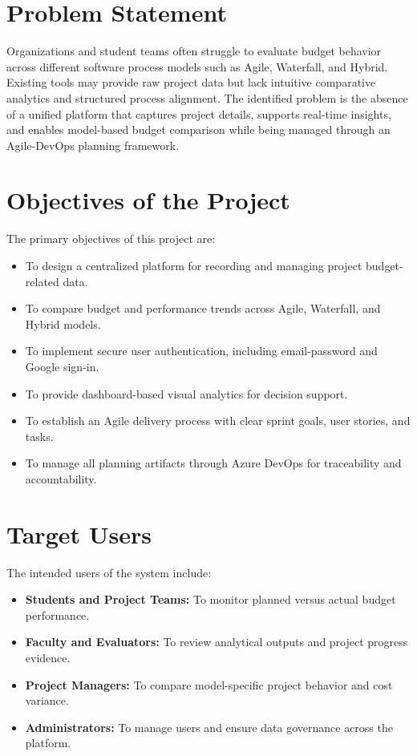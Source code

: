 \documentclass[12pt,a4paper]{article}
\begin{document}
\section{Problem Statement}
Organizations and student teams often struggle to evaluate budget behavior across different software process models such as Agile, Waterfall, and Hybrid. Existing tools may provide raw project data but lack intuitive comparative analytics and structured process alignment. The identified problem is the absence of a unified platform that captures project details, supports real-time insights, and enables model-based budget comparison while being managed through an Agile-DevOps planning framework.

\section{Objectives of the Project}
The primary objectives of this project are:
\begin{itemize}
    \item To design a centralized platform for recording and managing project budget-related data.
    \item To compare budget and performance trends across Agile, Waterfall, and Hybrid models.
    \item To implement secure user authentication, including email-password and Google sign-in.
    \item To provide dashboard-based visual analytics for decision support.
    \item To establish an Agile delivery process with clear sprint goals, user stories, and tasks.
    \item To manage all planning artifacts through Azure DevOps for traceability and accountability.
\end{itemize}

\section{Target Users}
The intended users of the system include:
\begin{itemize}
    \item \textbf{Students and Project Teams:} To monitor planned versus actual budget performance.
    \item \textbf{Faculty and Evaluators:} To review analytical outputs and project progress evidence.
    \item \textbf{Project Managers:} To compare model-specific project behavior and cost variance.
    \item \textbf{Administrators:} To manage users and ensure data governance across the platform.
\end{itemize}
\end{document}
